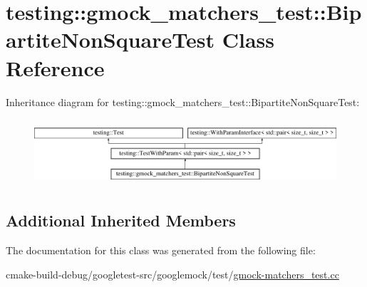 \hypertarget{classtesting_1_1gmock__matchers__test_1_1BipartiteNonSquareTest}{}\section{testing\+::gmock\+\_\+matchers\+\_\+test\+::Bipartite\+Non\+Square\+Test Class Reference}
\label{classtesting_1_1gmock__matchers__test_1_1BipartiteNonSquareTest}
Inheritance diagram for testing\+::gmock\+\_\+matchers\+\_\+test\+::Bipartite\+Non\+Square\+Test\+:\begin{figure}[H]
\begin{center}
\leavevmode
\includegraphics[height=2.492581cm]{classtesting_1_1gmock__matchers__test_1_1BipartiteNonSquareTest}
\end{center}
\end{figure}
\subsection*{Additional Inherited Members}


The documentation for this class was generated from the following file\+:\begin{DoxyCompactItemize}
\item 
cmake-\/build-\/debug/googletest-\/src/googlemock/test/\mbox{\hyperlink{gmock-matchers__test_8cc}{gmock-\/matchers\+\_\+test.\+cc}}\end{DoxyCompactItemize}
